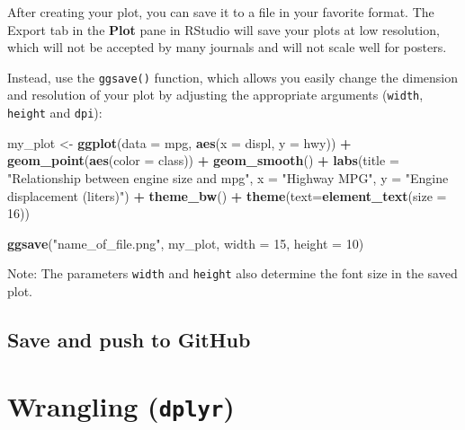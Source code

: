 \documentclass[]{book}
\newenvironment{Shaded}{\begin{snugshade}}{\end{snugshade}}
\newcommand{\KeywordTok}[1]{\textcolor[rgb]{0.13,0.29,0.53}{\textbf{#1}}}
\newcommand{\DataTypeTok}[1]{\textcolor[rgb]{0.13,0.29,0.53}{#1}}
\newcommand{\DecValTok}[1]{\textcolor[rgb]{0.00,0.00,0.81}{#1}}
\newcommand{\StringTok}[1]{\textcolor[rgb]{0.31,0.60,0.02}{#1}}
\newcommand{\OperatorTok}[1]{\textcolor[rgb]{0.81,0.36,0.00}{\textbf{#1}}}
\newcommand{\NormalTok}[1]{#1}
\theoremstyle{definition}
\theoremstyle{definition}
\theoremstyle{definition}
\theoremstyle{remark}
\begin{document}
After creating your plot, you can save it to a file in your favorite
format. The Export tab in the \textbf{Plot} pane in RStudio will save
your plots at low resolution, which will not be accepted by many
journals and will not scale well for posters.

Instead, use the \texttt{ggsave()} function, which allows you easily
change the dimension and resolution of your plot by adjusting the
appropriate arguments (\texttt{width}, \texttt{height} and
\texttt{dpi}):

\begin{Shaded}
\begin{Highlighting}[]
\NormalTok{my_plot <-}\StringTok{ }\KeywordTok{ggplot}\NormalTok{(}\DataTypeTok{data =}\NormalTok{ mpg, }\KeywordTok{aes}\NormalTok{(}\DataTypeTok{x =}\NormalTok{ displ, }\DataTypeTok{y =}\NormalTok{ hwy)) }\OperatorTok{+}\StringTok{ }
\StringTok{  }\KeywordTok{geom_point}\NormalTok{(}\KeywordTok{aes}\NormalTok{(}\DataTypeTok{color =}\NormalTok{ class)) }\OperatorTok{+}\StringTok{ }
\StringTok{  }\KeywordTok{geom_smooth}\NormalTok{() }\OperatorTok{+}
\StringTok{  }\KeywordTok{labs}\NormalTok{(}\DataTypeTok{title =} \StringTok{"Relationship between engine size and mpg"}\NormalTok{,}
         \DataTypeTok{x =} \StringTok{"Highway MPG"}\NormalTok{,}
         \DataTypeTok{y =} \StringTok{"Engine displacement (liters)"}\NormalTok{) }\OperatorTok{+}
\StringTok{  }\KeywordTok{theme_bw}\NormalTok{() }\OperatorTok{+}
\StringTok{  }\KeywordTok{theme}\NormalTok{(}\DataTypeTok{text=}\KeywordTok{element_text}\NormalTok{(}\DataTypeTok{size =} \DecValTok{16}\NormalTok{))}

\KeywordTok{ggsave}\NormalTok{(}\StringTok{"name_of_file.png"}\NormalTok{, my_plot, }\DataTypeTok{width =} \DecValTok{15}\NormalTok{, }\DataTypeTok{height =} \DecValTok{10}\NormalTok{)}
\end{Highlighting}
\end{Shaded}

Note: The parameters \texttt{width} and \texttt{height} also determine
the font size in the saved plot.

\section{Save and push to GitHub}\label{save-and-push-to-github}

\chapter{\texorpdfstring{Wrangling
(\texttt{dplyr})}{Wrangling (dplyr)}}\label{dplyr}
\end{document}
